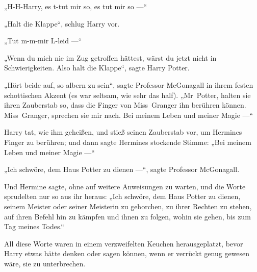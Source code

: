 „H-H-Harry, es t-tut mir so, es tut mir so —“

„Halt die Klappe“, schlug Harry vor.

„Tut m-m-mir L-leid —“

„Wenn du mich nie im Zug getroffen hättest, wärst du jetzt nicht in Schwierigkeiten. Also halt die Klappe“, sagte Harry Potter.

„Hört beide auf, so albern zu sein“, sagte Professor McGonagall in ihrem festen schottischen Akzent (es war seltsam, wie sehr das half).
„Mr~Potter, halten sie ihren Zauberstab so, dass die Finger von Miss~Granger ihn berühren können. Miss~Granger, sprechen sie mir nach. Bei meinem Leben und meiner Magie —“

Harry tat, wie ihm geheißen, und stieß seinen Zauberstab vor, um Hermines Finger zu berühren; und dann sagte Hermines stockende Stimme:
„Bei meinem Leben und meiner Magie —“

„Ich schwöre, dem Haus Potter zu dienen —“, sagte Professor McGonagall.

Und Hermine sagte, ohne auf weitere Anweisungen zu warten, und die Worte sprudelten nur so aus ihr heraus:
„Ich schwöre, dem Haus Potter zu dienen, seinem Meister oder seiner Meisterin zu gehorchen, zu ihrer Rechten zu stehen, auf ihren Befehl hin zu kämpfen und ihnen zu folgen, wohin sie gehen, bis zum Tag meines Todes.“

All diese Worte waren in einem verzweifelten Keuchen herausgeplatzt, bevor Harry etwas hätte denken oder sagen können, wenn er verrückt genug gewesen wäre, sie zu unterbrechen.

